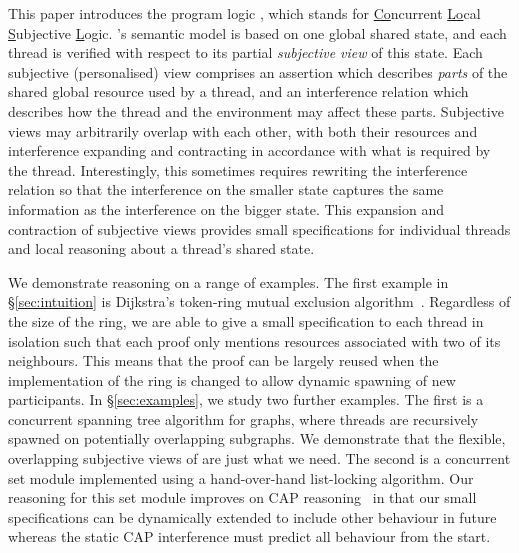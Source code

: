 This paper introduces the program logic \colosl, which stands for
\underline{Co}ncurrent \underline{Lo}cal \underline{S}ubjective
\underline{L}ogic. \colosl's semantic model is based on one global
shared state, and each thread is verified with respect to its partial
{\em subjective view} of this state.  Each subjective (personalised)
view comprises an assertion which describes \emph{parts} of the shared
global resource used by a thread, and an interference relation which
describes how the thread and the environment may affect these parts.
Subjective views may arbitrarily overlap with each other, with both
their resources and interference expanding and contracting in
accordance with what is required by the thread. Interestingly, this
sometimes requires rewriting the interference relation so that the
interference on the smaller state captures the same information as the
interference on the bigger state. This expansion and contraction of
subjective views provides small specifications for individual threads
and local reasoning about a thread's shared state.



We demonstrate \colosl reasoning on a range of examples.  The first
example in \S\ref{sec:intuition} is Dijkstra's token-ring mutual
exclusion algorithm~\cite{dijkstra74}. Regardless of the size of the
ring, we are able to give a small specification to  each thread in
isolation such that each proof only mentions resources
associated with two of its neighbours. This means that the proof can be largely reused when the
implementation of the ring is changed to allow dynamic spawning of new
participants.  In \S\ref{sec:examples}, we study two further
examples. The first is a concurrent spanning tree algorithm for
graphs, where threads are recursively spawned on potentially
overlapping subgraphs. We demonstrate that the flexible, overlapping
subjective views of \colosl are just what we need. 
The second is a concurrent set module implemented 
using a hand-over-hand
list-locking algorithm. Our \colosl reasoning  for this set module  improves
on CAP reasoning~\cite{cap-ecoop10} in that our small
specifications can be dynamically extended to include other behaviour
in future
whereas the  static CAP interference  must predict all behaviour from the start. 



